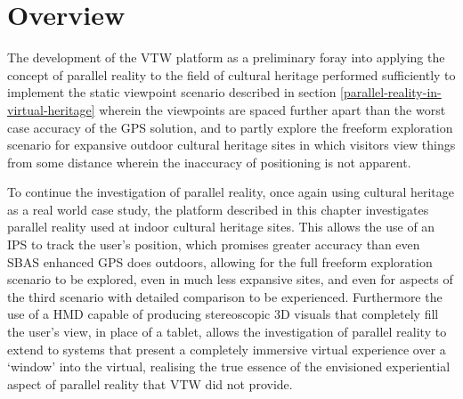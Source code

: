 


\section{Overview}
The development of the VTW platform as a preliminary foray into applying the concept of parallel reality to the field of cultural heritage performed sufficiently to implement the static viewpoint scenario described in section \ref{parallel-reality-in-virtual-heritage} wherein the viewpoints are spaced further apart than the worst case accuracy of the GPS solution, and to partly explore the freeform exploration scenario for expansive outdoor cultural heritage sites in which visitors view things from some distance wherein the inaccuracy of positioning is not apparent.

To continue the investigation of parallel reality, once again using cultural heritage as a real world case study, the platform described in this chapter investigates parallel reality used at indoor cultural heritage sites. This allows the use of an IPS to track the user's position, which promises greater accuracy than even SBAS enhanced GPS does outdoors, allowing for the full freeform exploration scenario to be explored, even in much less expansive sites, and even for aspects of the third scenario with detailed comparison to be experienced. Furthermore the use of a HMD capable of producing stereoscopic 3D visuals that completely fill the user's view, in place of a tablet, allows the investigation of parallel reality to extend to systems that present a completely immersive virtual experience over a `window' into the virtual, realising the true essence of the envisioned experiential aspect of parallel reality that VTW did not provide.


